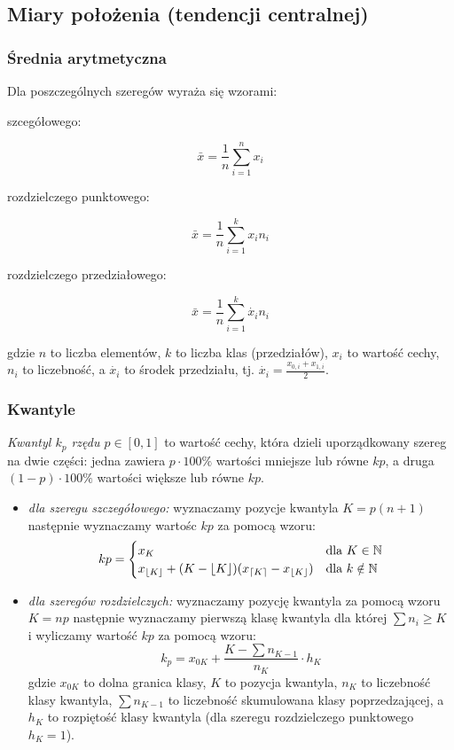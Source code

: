 \documentclass[../Matematyka.tex]{subfiles}
\begin{document}
\newpage
\subsection{Miary położenia (tendencji centralnej)}
\subsubsection*{Średnia arytmetyczna}
Dla poszczególnych szeregów wyraża się wzorami:
\begin{multicols}{3}
    \begin{center}szcegółowego:\end{center}
    \[\bar{x} = \frac{1}{n} \sum_{i=1}^{n}x_i\]
    \begin{center}rozdzielczego punktowego:\end{center}
    \[\bar{x} = \frac{1}{n} \sum_{i=1}^{k}x_in_i\]
    \begin{center}rozdzielczego przedziałowego:\end{center}
    \[\bar{x} = \frac{1}{n} \sum_{i=1}^{k}\dot{x_i}n_i\]
\end{multicols}
gdzie \(n\) to liczba elementów, \(k\) to liczba klas (przedziałów), \(x_i\) to wartość cechy, \(n_i\) to liczebność, a \(\dot{x_i}\) to środek przedziału, tj. \(\dot{x_i} = \frac{x_{0,i} + x_{1,i}}{2}\).
\subsubsection*{Kwantyle}
{\it Kwantyl \(k_p\) rzędu \(p \in [0,1]\)} to wartość cechy, która dzieli uporządkowany szereg na dwie części: jedna zawiera \(p\cdot100\%\) wartości mniejsze lub równe \(kp\), a druga \((1-p)\cdot100\%\) wartości większe lub równe \(kp\).
\begin{itemize}
    \item {\it dla szeregu szczegółowego:} wyznaczamy pozycje kwantyla \(K = p(n+1)\) następnie wyznaczamy wartośc \(kp\) za pomocą wzoru:
    \[kp =
        \begin{cases}
            x_K & \text{dla } K \in \mathbb{N} \\
            x_{\lfloor K \rfloor} + (K - \lfloor K \rfloor)(x_{\lceil K \rceil} - x_{\lfloor K \rfloor}) & \text{dla } k \notin \mathbb{N}
        \end{cases}\] 
    \item {\it dla szeregów rozdzielczych:} wyznaczamy pozycję kwantyla za pomocą wzoru \(K = np\) następnie wyznaczamy pierwszą klasę kwantyla dla której \(\sum n_i \geq K\) i wyliczamy wartość \(kp\) za pomocą wzoru: 
    \[k_p=x_{0K} + \frac{K - \sum n_{K-1}}{n_K}\cdot h_K\]
    gdzie \(x_{0K}\) to dolna granica klasy, \(K\) to pozycja kwantyla, \(n_K\) to liczebność klasy kwantyla, \(\sum n_{K-1}\) to liczebność skumulowana klasy poprzedzającej, a \(h_K\) to rozpiętość klasy kwantyla (dla szeregu rozdzielczego punktowego \(h_K = 1\)).
\end{itemize}
\end{document}
